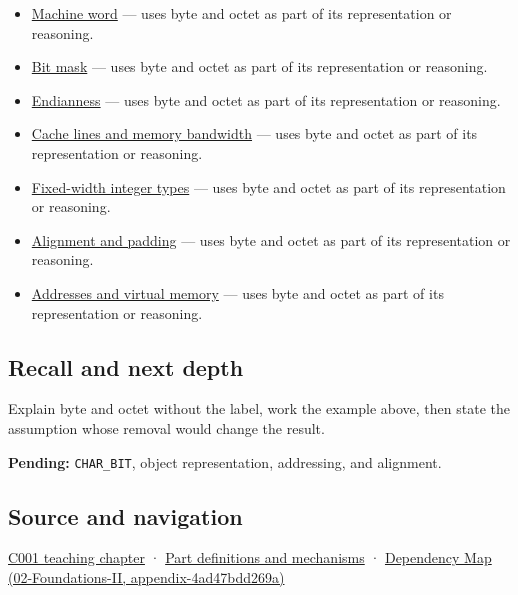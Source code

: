 \begin{itemize}
\tightlist
\item
  \hyperref[appendix-d67a19507dc5]{Machine word} --- uses byte and octet as part of its representation or reasoning.
\item
  \hyperref[appendix-dbe5905163c2]{Bit mask} --- uses byte and octet as part of its representation or reasoning.
\item
  \hyperref[appendix-bc07c3d25b18]{Endianness} --- uses byte and octet as part of its representation or reasoning.
\item
  \hyperref[appendix-e4ccdbab8320]{Cache lines and memory bandwidth} --- uses byte and octet as part of its representation or reasoning.
\item
  \hyperref[appendix-cc04044b5782]{Fixed-width integer types} --- uses byte and octet as part of its representation or reasoning.
\item
  \hyperref[appendix-a1f7c53b4742]{Alignment and padding} --- uses byte and octet as part of its representation or reasoning.
\item
  \hyperref[appendix-18ee4f913c3c]{Addresses and virtual memory} --- uses byte and octet as part of its representation or reasoning.
\end{itemize}

\subsection{Recall and next depth}\label{appendix-5bee2df85484-recall-and-next-depth}

Explain byte and octet without the label, work the example above, then state the assumption whose removal would change the result.

\textbf{Pending:} \texttt{CHAR\_BIT}, object representation, addressing, and alignment.

\subsection{Source and navigation}\label{appendix-5bee2df85484-source-and-navigation}

\hyperref[01-foundations-i-ch001-from-a-signal-to-an-interpretation]{C001 teaching chapter} · \hyperref[appendix-fd090d982a15]{Part definitions and mechanisms} · \href{../02-Foundations-II/main.pdf\#nameddest=appendix-4ad47bdd269a}{Dependency Map (02-Foundations-II, appendix-4ad47bdd269a)}
